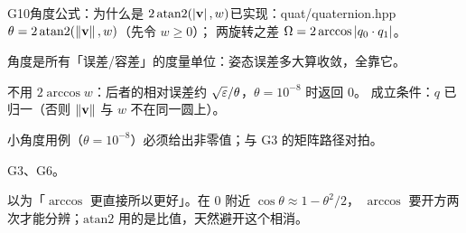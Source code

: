 \begin{know}{G10}{角度公式：为什么是 $2\,\mathrm{atan2}(\left\lvert \mathbf v\right\rvert,w)$}{已实现：quat/quaternion.hpp}
 $\theta=2\,\mathrm{atan2}(\left\lVert \mathbf v\right\rVert,w)$（先令 $w\ge0$）；
两旋转之差 $\Omega=2\arccos\left\lvert q_0\cdot q_1\right\rvert$。

 角度是所有「误差/容差」的度量单位：姿态误差多大算收敛，全靠它。

 不用 $2\arccos w$：后者的相对误差约 $\sqrt{\varepsilon}/\theta$，$\theta=10^{-8}$ 时返回 0。
成立条件：$q$ 已归一（否则 $\left\lVert \mathbf v\right\rVert$ 与 $w$ 不在同一圆上）。

 小角度用例（$\theta=10^{-8}$）必须给出非零值；与 G3 的矩阵路径对拍。

 G3、G6。

 以为「$\arccos$ 更直接所以更好」。在 0 附近 $\cos\theta\approx1-\theta^{2}/2$，
$\arccos$ 要开方两次才能分辨；$\mathrm{atan2}$ 用的是比值，天然避开这个相消。
\end{know}
